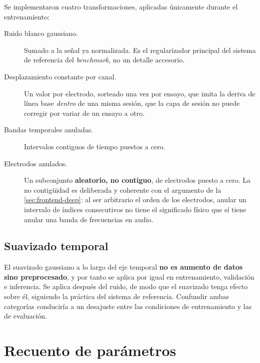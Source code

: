 Se implementaron cuatro transformaciones, aplicadas únicamente durante el entrenamiento:

\begin{description}
  \item[Ruido blanco gaussiano.] Sumado a la señal ya normalizada. Es el regularizador principal del sistema de referencia del \textit{benchmark}, no un detalle accesorio.
  \item[Desplazamiento constante por canal.] Un valor por electrodo, sorteado una vez por ensayo, que imita la deriva de línea base \textit{dentro} de una misma sesión, que la capa de sesión no puede corregir por variar de un ensayo a otro.
  \item[Bandas temporales anuladas.] Intervalos contiguos de tiempo puestos a cero.
  \item[Electrodos anulados.] Un subconjunto \textbf{aleatorio, no contiguo}, de electrodos puesto a cero. La no contigüidad es deliberada y coherente con el argumento de la \cref{sec:frontend-deep}: al ser arbitrario el orden de los electrodos, anular un intervalo de índices consecutivos no tiene el significado físico que sí tiene anular una banda de frecuencias en audio.
\end{description}


\subsection{Suavizado temporal}

El suavizado gaussiano a lo largo del eje temporal \textbf{no es aumento de datos sino preprocesado}, y por tanto se aplica por igual en entrenamiento, validación e inferencia. Se aplica después del ruido, de modo que el suavizado tenga efecto sobre él, siguiendo la práctica del sistema de referencia. Confundir ambas categorías conduciría a un desajuste entre las condiciones de entrenamiento y las de evaluación.

\section{Recuento de parámetros}
\label{sec:recuento-parametros}

